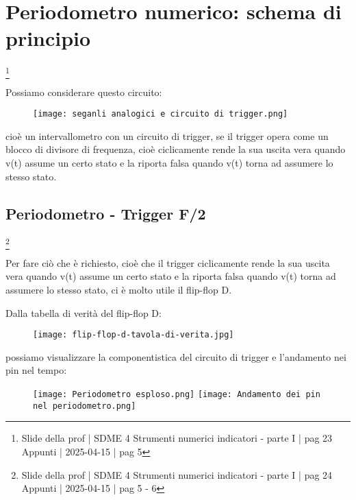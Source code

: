 \newpage 

\section{Periodometro numerico: schema di principio}
\footnote{Slide della prof | SDME 4 Strumenti numerici indicatori - parte I | pag 23 \\  
Appunti | 2025-04-15 | pag 5}

Possiamo considerare questo circuito: 

\begin{figure}[h]
    \centering
    \texttt{[image: seganli analogici e circuito di trigger.png]}
\end{figure} 

cioè un intervallometro con un circuito di trigger, se il trigger opera come un blocco di divisore di frequenza, 
cioè ciclicamente rende la sua uscita vera quando v(t) assume un certo stato e la riporta falsa quando v(t) torna ad assumere lo stesso stato. \newline 

\newpage 

\subsection{Periodometro - Trigger F/2}
\footnote{Slide della prof | SDME 4 Strumenti numerici indicatori - parte I | pag 24 \\  
Appunti | 2025-04-15 | pag 5 - 6}

Per fare ciò che è richiesto, cioè che il trigger ciclicamente rende la sua uscita vera quando v(t) assume un certo stato e la riporta falsa quando v(t) torna ad assumere lo stesso stato, 
ci è molto utile il flip-flop D. \newline 

Dalla tabella di verità del flip-flop D: 

\begin{figure}[h]
    \centering
    \texttt{[image: flip-flop-d-tavola-di-verita.jpg]}
\end{figure} 

possiamo visualizzare la componentistica del circuito di trigger e l'andamento nei pin nel tempo: 

\begin{figure}[h]
    \centering
    \texttt{[image: Periodometro esploso.png]}
    \texttt{[image: Andamento dei pin nel periodometro.png]}
\end{figure}

